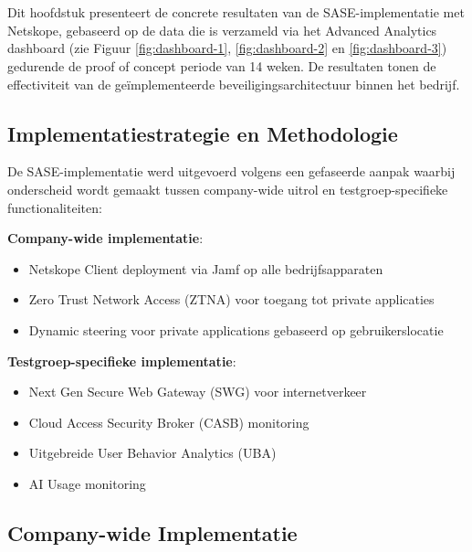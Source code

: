 
\chapter{}%
\label{ch:resultaten}

Dit hoofdstuk presenteert de concrete resultaten van de SASE-implementatie met Netskope, gebaseerd op de data die is verzameld via het Advanced Analytics dashboard (zie Figuur \ref{fig:dashboard-1}, \ref{fig:dashboard-2} en \ref{fig:dashboard-3}) gedurende de proof of concept periode van 14 weken. De resultaten tonen de effectiviteit van de geïmplementeerde beveiligingsarchitectuur binnen het bedrijf.


\section{Implementatiestrategie en Methodologie}
De SASE-implementatie werd uitgevoerd volgens een gefaseerde aanpak waarbij onderscheid wordt gemaakt tussen company-wide uitrol en testgroep-specifieke functionaliteiten:

\textbf{Company-wide implementatie}:
\begin{itemize}
    \item Netskope Client deployment via Jamf op alle bedrijfsapparaten
    \item Zero Trust Network Access (ZTNA) voor toegang tot private applicaties
    \item Dynamic steering voor private applications gebaseerd op gebruikerslocatie
\end{itemize}

\vspace{2ex}

\textbf{Testgroep-specifieke implementatie}:
\begin{itemize}
    \item Next Gen Secure Web Gateway (SWG) voor internetverkeer
    \item Cloud Access Security Broker (CASB) monitoring
    \item Uitgebreide User Behavior Analytics (UBA)
    \item AI Usage monitoring
\end{itemize}

\section{Company-wide Implementatie}
